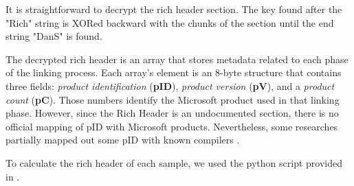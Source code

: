 It is straightforward to decrypt the rich header section. The key found after the "Rich" string is XORed backward with the chunks of the section until the end string "DanS" is found.  

The decrypted rich header is an array that stores metadata related to each phase of the linking process. Each array's element is an 8-byte structure that contains three fields: \textit{product identification} (\textbf{pID}), \textit{product version} (\textbf{pV}), and a \textit{product count} (\textbf{pC}). Those numbers identify the Microsoft product used in that linking phase. However, since the Rich Header is an undocumented section, there is no official mapping of pID with Microsoft products. Nevertheless, some researches partially mapped out some pID with known compilers \cite{richGit}.

To calculate the rich header of each sample, we used the python script provided in \cite{dubyk2019sans}.